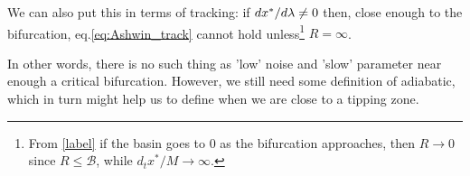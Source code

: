 We can also put this in terms of tracking: if $dx^*/d\lambda \neq0$ then, close enough to the bifurcation, eq.\eqref{eq:Ashwin_track} cannot hold unless\footnote{From \cref{label} if the basin goes to $0$ as the bifurcation approaches, then $R\rightarrow 0$ since $R\leq \mathcal{B}$, while $d_t x^*/M\rightarrow \infty$.} $R=\infty$. 

In other words, there is no such thing as 'low' noise and 'slow' parameter near enough a critical bifurcation. 
However, we still need some definition of adiabatic, which in turn might help us to define when we are close to a tipping zone. 


                     













